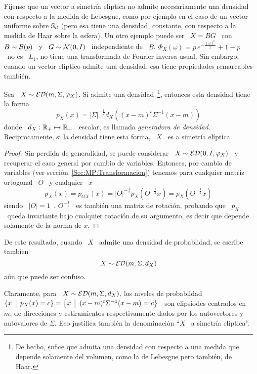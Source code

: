 Fijense  que  un vector  a  simetr\'ia  el\'iptica  no admite  necesariamente  una
densidad con respecto a la medida de  Lebesgue, como por ejemplo en el caso de un
vector uniforme  sobre $\mathbb{S}_d$  (pero esa tiene  una densidad,  constante, con
respecto a la medida de Haar sobre la esfera). Un otro ejemplo puede ser \ $X = B
G$  \ con  \  $B \sim  \mathcal{B}(p)$  \  y \  $G  \sim \mathcal{N}(0,I)$  \  independiente de  \
$B$. $\Phi_X(\omega)  = p \, e^{-\frac{\|  \omega \|^2}{2}} + 1  - p$ \  no es \
$L_1$,  \ie no tiene  una transformada  de Fourier  inversa usual.  Sin embargo,
cuando un vector el\'iptico admite una densidad, esa tiene propiedades remarcables
tambi\'en.
%
\begin{teorema}
%
  Sea \ $X \sim \mathcal{ED}(m,\Sigma,\varphi_X)$. Si  admite una  densidad~\footnote{De hecho, sufice  que admita
    una densidad  con respecto  a una medida  que depende solamente  del volumen,
    como la de Lebesgue pero  tambi\'en, de Haar.}, entonces esta densidad tiene
  la forma
  \[
  p_X(x)  = |\Sigma|^{-\frac12} d_X\left( (x-m)^t \Sigma^{-1} (x-m) \right)
  \]
  donde \ $d_X:  \mathbb{R}_+ \mapsto \mathbb{R}_+$ \ escalar,  es llamada {\em generadora
    de densidad}. Reciprocamente, si la densidad  tiene esta forma, \ $X$ \ es a
  simetr\'ia el\'iptica.
\end{teorema}
%
\begin{proof}
  Sin perdida de generalidad, se  puede considerar \ $X \sim \mathcal{ED}(0,I,\varphi_X)$
  \ y recuperar  el caso general por cambio de  variables.  Entonces, por cambio
  de   variables   (ver   secci\'on~\ref{Sec:MP:Transformacion})  tenemos   para
  cualquier matriz ortogonal \ $O$ \ y cualquier \ $x$
  \[
  p_X(x)  = p_{O  X}(x)  =  |O|^{-\frac12} p_X\left(  O^{-\frac12}  x \right)  =
  p_X\left( O^{-\frac12} x \right)
  \]
  siendo \ $|O|  = 1$~\cite{Bha97, HorJoh13}. $O^{-\frac12}$ \  es tambi\'en una
  matriz de rotaci\'on,  probando que \ $p_X$ \  queda invariante bajo cualquier
  rotaci\'on de su argumento, es decir que depende solamente de la norma de $x$.
\end{proof}

De este resultado, cuando \ $X$ \ admite una densidad de probablidad, se escribe tambien
%
\[
X \sim \mathcal{ED}(m,\Sigma,d_X)
\]
%
a\'un que puede ser confuso.

Claramente, para \ $X \sim  \mathcal{ED}(m,\Sigma,d_X)$, los niveles de probabildad \ $\{
x \:\: \big| \:\: p_X(x)  = c \} = \left\{  x \:\: \big| \:\: (x-m)^t \Sigma^{-1} (x-m) =  c \right\}$ \
son   elipsiodes  centrados   en   \  $m$,   de   direcciones  y   estiramientos
respectivamente  dados  por los  autovectores  y  autovalores  de $\Sigma$.  Eso
justifica tambi\'en la denominaci\'on ``$X$ \ a simetr\'ia el\'iptica''.

